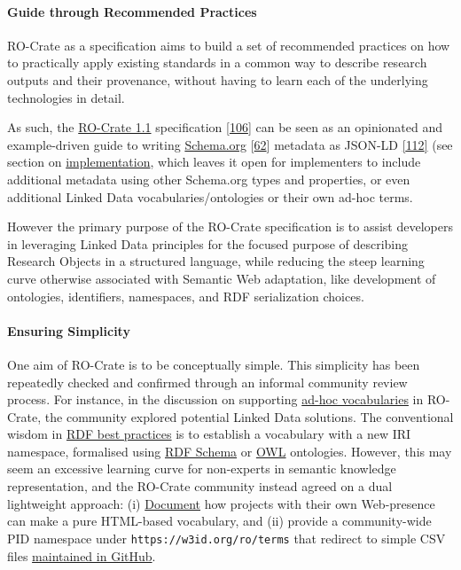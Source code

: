 \hypertarget{recommendedpractices}{%
\paragraph{Guide through Recommended
Practices}\label{recommendedpractices}}

RO-Crate as a specification aims to build a set of recommended practices
on how to practically apply existing standards in a common way to
describe research outputs and their provenance, without having to learn
each of the underlying technologies in detail.

As such, the \href{https://w3id.org/ro/crate/1.1}{RO-Crate 1.1}
specification {[}\href{https://doi.org/10.5281/zenodo.4541002}{106}{]}
can be seen as an opinionated and example-driven guide to writing
\href{https://schema.org/}{Schema.org}
{[}\href{https://doi.org/10.1145/2857274.2857276}{62}{]} metadata as
JSON-LD
\href{https://www.w3.org/TR/2014/REC-json-ld-20140116/}{{[}112{]}} (see
section on \protect\hyperlink{implementation}{implementation}, which
leaves it open for implementers to include additional metadata using
other Schema.org types and properties, or even additional Linked Data
vocabularies/ontologies or their own ad-hoc terms.

However the primary purpose of the RO-Crate specification is to assist
developers in leveraging Linked Data principles for the focused purpose
of describing Research Objects in a structured language, while reducing
the steep learning curve otherwise associated with Semantic Web
adaptation, like development of ontologies, identifiers, namespaces, and
RDF serialization choices.

\hypertarget{simplicity}{%
\paragraph{Ensuring Simplicity}\label{simplicity}}

One aim of RO-Crate is to be conceptually simple. This simplicity has
been repeatedly checked and confirmed through an informal community
review process. For instance, in the discussion on supporting
\href{https://github.com/ResearchObject/ro-crate/issues/71}{ad-hoc
vocabularies} in RO-Crate, the community explored potential Linked Data
solutions. The conventional wisdom in
\href{https://www.w3.org/TR/swbp-vocab-pub/}{RDF best practices} is to
establish a vocabulary with a new IRI namespace, formalised using
\href{http://www.w3.org/TR/2014/REC-rdf-schema-20140225/}{RDF Schema} or
\href{http://www.w3.org/TR/2012/REC-owl2-overview-20121211/}{OWL}
ontologies. However, this may seem an excessive learning curve for
non-experts in semantic knowledge representation, and the RO-Crate
community instead agreed on a dual lightweight approach: (i)
\href{https://www.researchobject.org/ro-crate/1.1/appendix/jsonld.html\#adding-new-or-ad-hoc-vocabulary-terms}{Document}
how projects with their own Web-presence can make a pure HTML-based
vocabulary, and (ii) provide a community-wide PID namespace under
\texttt{https://w3id.org/ro/terms} that redirect to simple CSV files
\href{https://github.com/ResearchObject/ro-terms}{maintained in GitHub}.

